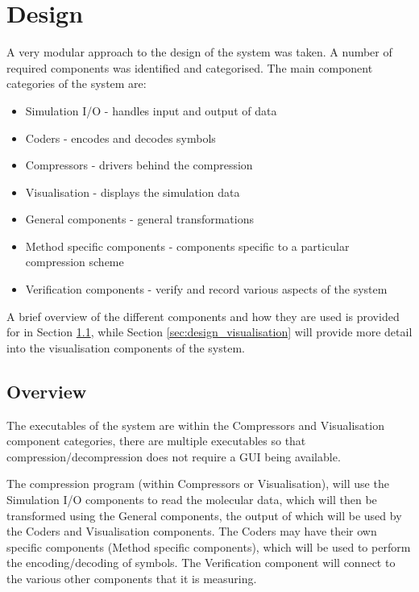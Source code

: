 \graphicspath{{./design/}}

\chapter{Design}
\label{cha:Design}


A very modular approach to the design of the system was taken. A number of
required components was identified and categorised. The main component
categories of the system are:

\begin{itemize}
  \item Simulation I/O - handles input and output of data
  \item Coders - encodes and decodes symbols
  \item Compressors - drivers behind the compression
  \item Visualisation - displays the simulation data
  \item General components - general transformations
  \item Method specific components - components specific to a particular
  compression scheme
  \item Verification components - verify and record various aspects of the
  system
\end{itemize}

A brief overview of the different components and how they are used is provided
for in Section \ref{sec:design_overview}, while Section
\ref{sec:design_visualisation} will provide more detail into the
visualisation components of the system.


\section{Overview}
\label{sec:design_overview}

The executables of the system are within the Compressors and Visualisation
component categories, there are multiple executables so that
compression/decompression does not require a GUI being available.

The compression program (within Compressors or Visualisation), will use the
Simulation I/O components to read the molecular data, which will then be
transformed using the General components, the output of which will be used by
the Coders and Visualisation components. The Coders may have their own specific
components (Method specific components), which will be used to perform the
encoding/decoding of symbols. The Verification component will connect to the
various other components that it is measuring.

